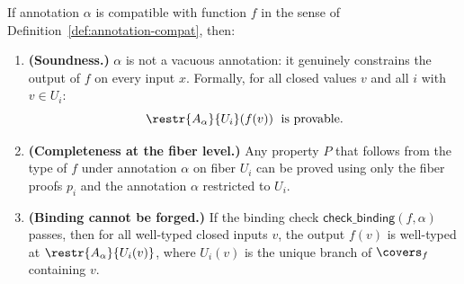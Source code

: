 \begin{theorem}
\label{thm:binding-soundness}
If annotation $\alpha$ is compatible with function $f$ in the sense of
Definition~\ref{def:annotation-compat}, then:
\begin{enumerate}
\item \textbf{(Soundness.)}
  $\alpha$ is not a vacuous annotation: it genuinely constrains the
  output of $f$ on every input $x$.  Formally, for all closed values $v$
  and all $i$ with $v \in U_i$:
  \[
    \restr{A_\alpha}{U_i}(f(v)) \;\text{ is provable}.
  \]
\item \textbf{(Completeness at the fiber level.)}
  Any property $P$ that follows from the type of $f$ under annotation
  $\alpha$ on fiber $U_i$ can be proved using only the fiber proofs
  $p_i$ and the annotation $\alpha$ restricted to $U_i$.
\item \textbf{(Binding cannot be forged.)}
  If the binding check $\mathsf{check\_binding}(f, \alpha)$ passes,
  then for all well-typed closed inputs $v$,
  the output $f(v)$ is well-typed at $\restr{A_\alpha}{U_i(v)}$,
  where $U_i(v)$ is the unique branch of $\covers_f$ containing $v$.
\end{enumerate}
\end{theorem}

